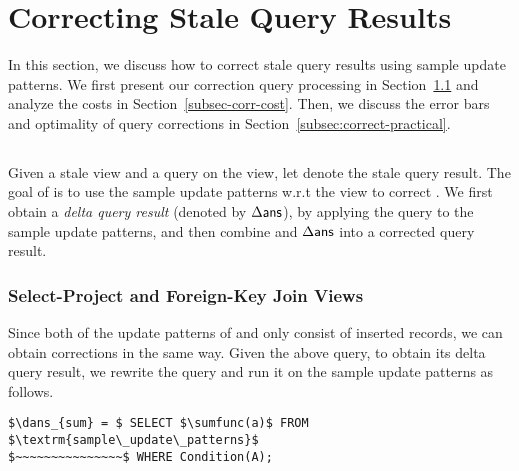 
\section{Correcting Stale Query Results}
\label{correction}
In this section, we discuss how to correct stale query results using sample update patterns. We first present our correction query processing in Section~\ref{subsec:correct-principle} and analyze the costs in Section~\ref{subsec-corr-cost}. Then, we discuss the error bars and optimality of query corrections in Section~\ref{subsec:correct-practical}.


\subsection{\Cqp}\label{subsec:correct-principle}
Given a stale view and a query on the view, let \ans denote the stale query result. The goal of \cqp is to use the sample update patterns w.r.t the view to correct \ans. We first obtain a \emph{delta query result} (denoted by $\Delta\textsf{ans}$), by applying the query to the sample update patterns, and then combine \ans and $\Delta\textsf{ans}$ into a corrected query result. 








\subsubsection{Select-Project and Foreign-Key Join Views} \label{subsubsec:correct-spfj}
Since both of the update patterns of \spview and \fjview only consist of inserted records, we can obtain corrections in the same way. Given the above query, to obtain its delta query result, we rewrite the query and run it on the sample update patterns as follows.  

\vspace{-.25em}

\begin{lstlisting}[mathescape,basicstyle={\scriptsize}]
$\dans_{sum} = $ SELECT $\sumfunc(a)$ FROM $\textrm{sample\_update\_patterns}$ 
$~~~~~~~~~~~~~~~$ WHERE Condition(A);
\end{lstlisting}

